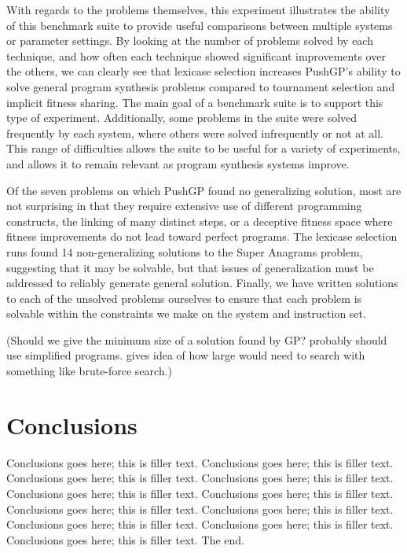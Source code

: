 \documentclass{sig-alternate}
\begin{document}
%

With regards to the problems themselves, this experiment illustrates the ability of this benchmark suite to provide useful comparisons between multiple systems or parameter settings. By looking at the number of problems solved by each technique, and how often each technique showed significant improvements over the others, we can clearly see that lexicase selection increases PushGP's ability to solve general program synthesis problems compared to tournament selection and implicit fitness sharing. The main goal of a benchmark suite is to support this type of experiment. Additionally, some problems in the suite were solved frequently by each system, where others were solved infrequently or not at all. This range of difficulties allows the suite to be useful for a variety of experiments, and allows it to remain relevant as program synthesis systems improve.

Of the seven problems on which PushGP found no generalizing solution, most are not surprising in that they require extensive use of different programming constructs, the linking of many distinct steps, or a deceptive fitness space where fitness improvements do not lead toward perfect programs. The lexicase selection runs found 14 non-generalizing solutions to the Super Anagrams problem, suggesting that it may be solvable, but that issues of generalization must be addressed to reliably generate general solution. Finally, we have written solutions to each of the unsolved problems ourselves to ensure that each problem is solvable within the constraints we make on the system and instruction set.




(Should we give the minimum size of a solution found by GP?
probably should use simplified programs.
gives idea of how large would need to search with something like brute-force search.)




\section{Conclusions}

Conclusions goes here; this is filler text. Conclusions goes here; this is filler text. Conclusions goes here; this is filler text. Conclusions goes here; this is filler text. Conclusions goes here; this is filler text. Conclusions goes here; this is filler text. Conclusions goes here; this is filler text. Conclusions goes here; this is filler text. Conclusions goes here; this is filler text. Conclusions goes here; this is filler text. Conclusions goes here; this is filler text. The end.
\end{document}
